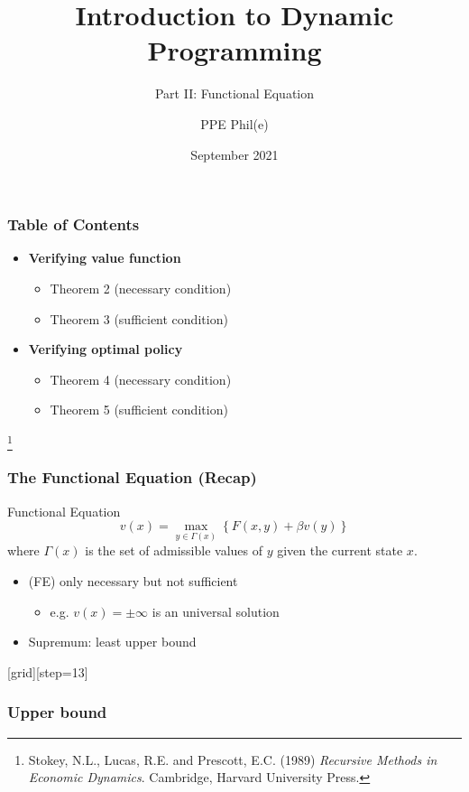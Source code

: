 \documentclass[aspectratio=169]{beamer}
\title[Dynamic Programming Part II] %
{Introduction to Dynamic Programming}
\subtitle{Part II: Functional Equation}
\author[PPE Phil(e)]
{PPE Phil(e)\inst{1}}
\institute[] %
{
  \inst{1}%
  material @ https://github.com/PPEphile
}
\date[2021] %
{September 2021}
\newcommand\blfootnote[1]{%
\begingroup
\renewcommand\thefootnote{}\footnote{#1}%
\addtocounter{footnote}{-1}%
\endgroup
}
\begin{document}
\frame{\titlepage}

\begin{frame}
\frametitle{Table of Contents}
\begin{itemize}
\item \textbf{Verifying \color{magenta} value function}
\begin{itemize}
\item \color{black} Theorem 2 (necessary condition)
\item Theorem 3 (sufficient condition)
\end{itemize}
\item \textbf{Verifying \color{blue}optimal policy}
\begin{itemize}
\item \color{black} Theorem 4 (necessary condition)
\item Theorem 5 (sufficient condition)
\end{itemize}
\end{itemize}

\blfootnote{Stokey, N.L., Lucas, R.E. and Prescott, E.C. (1989) \textit{Recursive Methods in Economic Dynamics}. Cambridge, Harvard University Press.}

\end{frame}

\begin{frame}
\frametitle{The Functional Equation (Recap)}
\begin{block}{Functional Equation}
\begin{equation}
v(x) = \max_{y \in \Gamma(x)} \left\lbrace F(x, y) + \beta v(y) \right\rbrace \tag{FE}
\end{equation}
where $\Gamma(x)$ is the set of admissible values of $y$ given the current state $x$.
\end{block}
\medskip
\begin{itemize}
\item (FE) only necessary but not sufficient
\begin{itemize}
\item e.g. $v(x) = \pm \infty$ is an universal solution
\end{itemize}
\item Supremum: least upper bound
\end{itemize}
\end{frame}

{
[grid][step=13]
\begin{frame}
\frametitle{Upper bound}
\end{frame}
}
\end{document}
